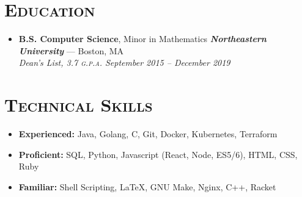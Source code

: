 \documentclass{article}
\begin{document}
\section*{\textsc{Education}}
\begin{itemize}[label={},leftmargin=*]
  \item \textbf{B.S. Computer Science}, Minor in Mathematics \hfill \textit{\textbf{Northeastern University}} --- Boston, MA \\
  \em{Dean's List}, 3.7 \textsc{g.p.a.}  \hfill \em{\textit{September 2015 -- December 2019}}
\end{itemize}

\section*{\textsc{Technical Skills}}
\begin{itemize}[label={},leftmargin=*]
  \item \textbf{Experienced:} Java, Golang, C, Git, Docker, Kubernetes, Terraform
  \item \textbf{Proficient:} SQL, Python, Javascript (React, Node, ES5/6), HTML, CSS, Ruby
  \item \textbf{Familiar:} Shell Scripting, LaTeX, GNU Make, Nginx, C++, Racket
\end{itemize}
\end{document}
